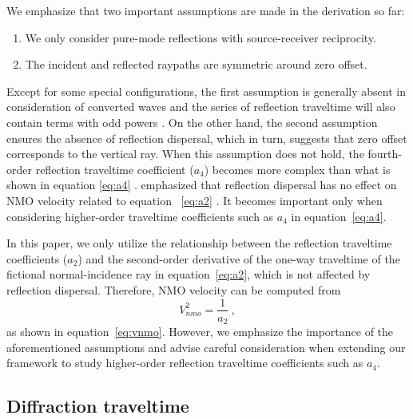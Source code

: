 We emphasize that two important assumptions are made in the derivation so far:
\begin{enumerate}
	\item We only consider pure-mode reflections with source-receiver reciprocity.
	\item The incident and reflected raypaths are symmetric around zero offset.
\end{enumerate}
Except for some special configurations, the first assumption is generally absent in consideration of converted waves and the series of reflection traveltime will also contain terms with odd powers \cite[]{tsvankin2011book,thomsenbook,korenravvetriclinic}. On the other hand, the second assumption ensures the absence of reflection dispersal, which in turn, suggests that zero offset corresponds to the vertical ray. When this assumption does not hold, the fourth-order reflection traveltime coefficient ($a_4$) becomes more complex than what is shown in equation \ref{eq:a4} \cite[]{pech2003,korenravvetriclinic}. \cite{nmoellipse} emphasized that reflection dispersal has no effect on NMO velocity related to equation ~\ref{eq:a2} \cite[]{hubralkrey}. It becomes important only when considering higher-order traveltime coefficients such as $a_4$ in equation~\ref{eq:a4}.

In this paper, we only utilize the relationship between the reflection traveltime coefficients ($a_2$) and the second-order derivative of the one-way traveltime of the fictional normal-incidence ray in equation~\ref{eq:a2}, which is not affected by reflection dispersal. Therefore, NMO velocity can be computed from
\begin{equation}
\label{eq:vnmoa}
V^2_{nmo} = \frac{1}{a_2}~,
\end{equation}
as shown in equation~\ref{eq:vnmo}. However, we emphasize the importance of the aforementioned assumptions and advise careful consideration when extending our framework to study higher-order reflection traveltime coefficients such as $a_4$.

\subsection{Diffraction traveltime}

